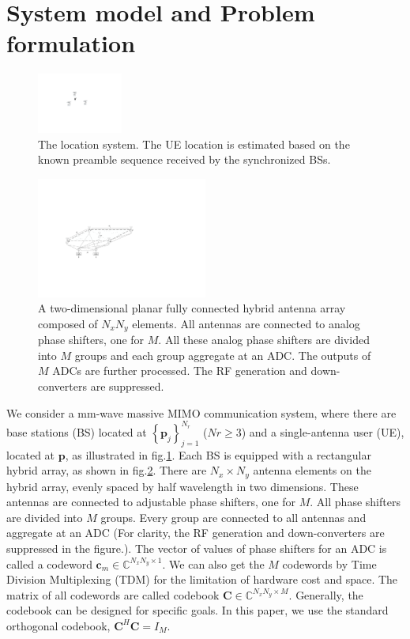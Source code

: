 \documentclass[journal]{IEEEtran}
\begin{document}
\section{System model and Problem formulation}
\label{sec:model and problem}
\begin{figure}[t]
  \centerline{\includegraphics[width=0.25\textwidth]{figures/mmWaveCommunicaitionSystem.pdf}}
  \centering
\caption{The location system. The UE location is estimated based on the known preamble sequence received by the synchronized BSs.}\label{System}
\end{figure}
\cite{Amar2004Direct}
\begin{figure}[t]
  \centerline{\includegraphics[width=0.5\textwidth]{figures/globalHybridArray.pdf}}
  \centering
\caption{A two-dimensional planar fully connected hybrid antenna array composed of $N_xN_y$ elements. All antennas are connected to analog phase shifters, one for $M$. All these analog phase shifters are divided into $M$ groups and each group aggregate at an ADC. The outputs of $M$ ADCs are further processed. The RF generation and down-converters are suppressed. }\label{GHA}
\end{figure}

We consider a mm-wave massive MIMO communication system, where there are base stations (BS) located at $\left\{\boldsymbol{p}_j\right\}_{j=1}^{N_r}$ ($Nr\geq 3$) and a single-antenna user (UE), located at $\boldsymbol{p}$, as illustrated in fig.\ref{System}. Each BS is equipped with a rectangular hybrid array, as shown in fig.\ref{GHA}. There are $N_x\times N_y$ antenna elements on the hybrid array, evenly spaced by half wavelength in two dimensions. These antennas are connected to adjustable phase shifters, one for $M$. All phase shifters are divided into $M$ groups. Every group are connected to all antennas and aggregate at an ADC (For clarity, the RF generation and down-converters are suppressed in the figure.). The vector of values of phase shifters for an ADC is called a codeword $\boldsymbol{c}_m \in \mathbb{C}^{N_xN_y \times 1}$. We can also get the $M$ codewords by Time Division Multiplexing (TDM) for the limitation of hardware cost and space. The matrix of all codewords are called codebook $\boldsymbol{C}\in \mathbb{C}^{N_xN_y \times M}$. Generally, the codebook can be designed for specific goals. In this paper, we use the standard orthogonal codebook, $\boldsymbol{C}^H\boldsymbol{C}=I_M$.
\end{document}
